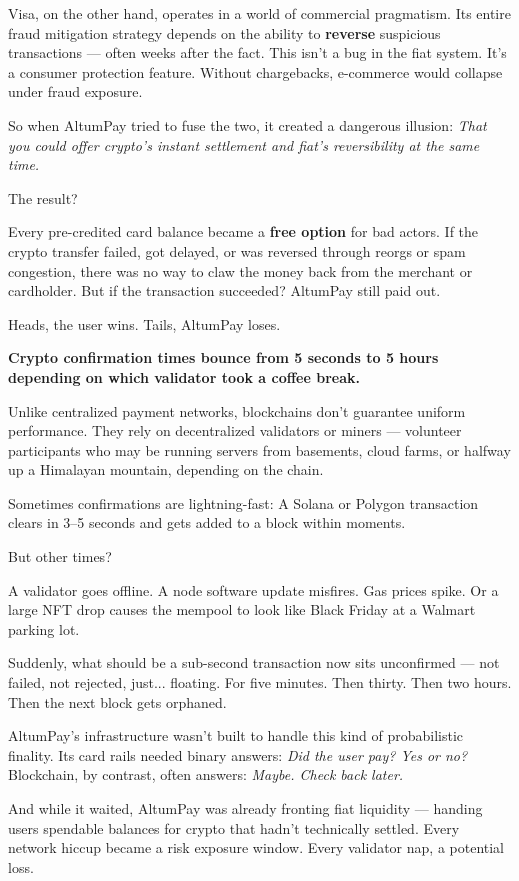 Visa, on the other hand, operates in a world of commercial pragmatism.  
Its entire fraud mitigation strategy depends on the ability to \textbf{reverse} suspicious transactions — often weeks after the fact. This isn’t a bug in the fiat system. It’s a consumer protection feature. Without chargebacks, e-commerce would collapse under fraud exposure.

So when AltumPay tried to fuse the two, it created a dangerous illusion:  
\textit{That you could offer crypto’s instant settlement and fiat’s reversibility at the same time.}

The result?

Every pre-credited card balance became a \textbf{free option} for bad actors.  
If the crypto transfer failed, got delayed, or was reversed through reorgs or spam congestion, there was no way to claw the money back from the merchant or cardholder.  
But if the transaction succeeded? AltumPay still paid out.

Heads, the user wins.  
Tails, AltumPay loses.


\textbf{Crypto confirmation times bounce from 5 seconds to 5 hours depending on which validator took a coffee break.}

Unlike centralized payment networks, blockchains don’t guarantee uniform performance.  
They rely on decentralized validators or miners — volunteer participants who may be running servers from basements, cloud farms, or halfway up a Himalayan mountain, depending on the chain.

Sometimes confirmations are lightning-fast:  
A Solana or Polygon transaction clears in 3–5 seconds and gets added to a block within moments.

But other times?

A validator goes offline.  
A node software update misfires.  
Gas prices spike.  
Or a large NFT drop causes the mempool to look like Black Friday at a Walmart parking lot.

Suddenly, what should be a sub-second transaction now sits unconfirmed — not failed, not rejected, just... floating.  
For five minutes.  
Then thirty.  
Then two hours.  
Then the next block gets orphaned.

AltumPay’s infrastructure wasn’t built to handle this kind of probabilistic finality.  
Its card rails needed binary answers:  
\emph{Did the user pay? Yes or no?}  
Blockchain, by contrast, often answers:  
\emph{Maybe. Check back later.}

And while it waited, AltumPay was already fronting fiat liquidity — handing users spendable balances for crypto that hadn’t technically settled.  
Every network hiccup became a risk exposure window.  
Every validator nap, a potential loss.

